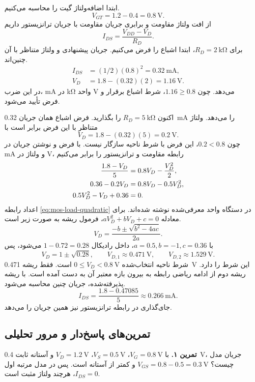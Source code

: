 ابتدا اضافه‌ولتاژ گیت را محاسبه می‌کنیم.
\[
 V_{GT}=1.2-0.4=\qty{0.8}{\volt}.
\]
از افت ولتاژ مقاومت و برابری جریان مقاومت با جریان ترانزیستور داریم
\begin{equation}
 I_{DS}=\frac{V_{DD}-V_D}{R_D}.
 \label{eq:mos-load-line}
\end{equation}
برای \(R_D=\qty{2}{\kilo\ohm}\)، ابتدا اشباع را فرض می‌کنیم.
جریان پیشنهادی و ولتاژ متناظر با آن چنین‌اند.
\[
 \begin{aligned}
 I_{DS}&=(1/2)(0.8)^2=\qty{0.32}{\milli\ampere},\\
 V_D&=1.8-(0.32)(2)=\qty{1.16}{\volt}.
 \end{aligned}
\]
در این ضرب، \unit{\milli\ampere} در \unit{\kilo\ohm} واحد \unit{\volt} می‌دهد.
چون \(1.16\ge0.8\)، شرط اشباع برقرار و فرض تأیید می‌شود.

اکنون \(R_D=\qty{5}{\kilo\ohm}\) را بگذارید. فرض اشباع همان جریان
\qty{0.32}{\milli\ampere} را می‌دهد. ولتاژ متناظر با این فرض برابر است با
\[
 V_D=1.8-(0.32)(5)=\qty{0.2}{\volt}.
\]
چون \(0.2<0.8\)، این فرض با شرط ناحیه سازگار نیست.
با فرض  و نوشتن جریان در \unit{\milli\ampere} و ولتاژ در \unit{\volt}،
رابطه مقاومت و ترانزیستور را برابر می‌کنیم
\begin{align}
 \frac{1.8-V_D}{5}&=0.8V_D-\frac{V_D^2}{2},\notag\\
 0.36-0.2V_D&=0.8V_D-0.5V_D^2,\notag\\
 0.5V_D^2-V_D+0.36&=0.
 \label{eq:mos-load-quadratic}
\end{align}
اعداد رابطه \eqref{eq:mos-load-quadratic} در دستگاه واحد معرفی‌شده نوشته شده‌اند.
برای معادله \(aV_D^2+bV_D+c=0\)، فرمول ریشه
به صورت زیر است.
\[
 V_D=\frac{-b\pm\sqrt{b^2-4ac}}{2a}.
\]
با \(a=0.5,b=-1,c=0.36\)، داخل رادیکال \(1-0.72=0.28\) می‌شود، پس
\begin{equation*}
 V_D=1\pm\sqrt{0.28},\qquad
 V_{D,1}\approx\qty{0.471}{\volt},\qquad
 V_{D,2}\approx\qty{1.529}{\volt}.
\end{equation*}
شرط ناحیه انتخاب‌شده \(0\le V_D<\qty{0.8}{\volt}\) است.
فقط ریشه \qty{0.471}{\volt} این شرط را دارد. ریشه دوم از ادامه ریاضی رابطه
 به بیرون بازه معتبر آن به دست آمده است. با ریشه پذیرفته‌شده،
جریان چنین محاسبه می‌شود.
\[
 I_{DS}=\frac{1.8-0.47085}{5}\approx\qty{0.266}{\milli\ampere}.
\]
جای‌گذاری در رابطه ترانزیستور نیز همین جریان را می‌دهد.

\subsection{تمرین‌های پاسخ‌دار و مرور تحلیلی}
\textbf{تمرین ۱.} با \(V_G=\qty{0.8}{\volt}\)، \(V_S=\qty{0.5}{\volt}\)،
\(V_D=\qty{1.2}{\volt}\) و آستانه ثابت \qty{0.4}{\volt}، جریان مدل چیست؟
\(V_{GS}=0.8-0.5=\qty{0.3}{\volt}\) و کمتر از آستانه است.
پس در مدل مرتبه اول \(I_{DS}=0\)، هرچند ولتاژ  مثبت است.

